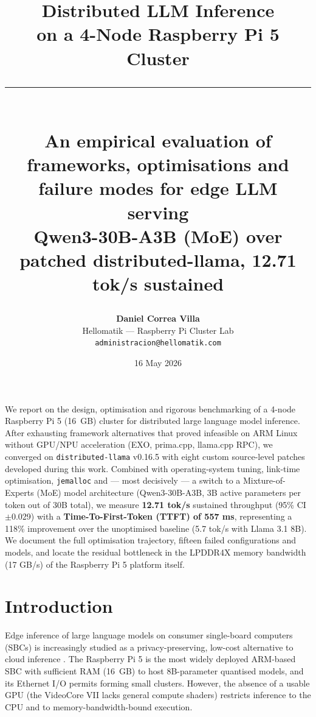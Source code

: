 \documentclass[11pt,a4paper]{article}
\title{
  \vspace{-1cm}
  {\Huge\bfseries\color{primary} Distributed LLM Inference}\\[0.3cm]
  {\Large on a 4-Node Raspberry Pi 5 Cluster}\\[0.4cm]
  \rule{\textwidth}{1.5pt}\\[0.3cm]
  {\large An empirical evaluation of frameworks, optimisations and \\ failure modes for edge LLM serving}\\[0.3cm]
  {\normalsize Qwen3-30B-A3B (MoE) over patched distributed-llama, 12.71 tok/s sustained}
}
\author{
  \textbf{Daniel Correa Villa}\\
  \small Hellomatik — Raspberry Pi Cluster Lab\\
  \small \texttt{administracion@hellomatik.com}
}
\date{16 May 2026}
\begin{document}
\maketitle
\thispagestyle{empty}

\begin{tcolorbox}[colback=primary!5,colframe=primary!50,title=\textbf{Abstract}]
We report on the design, optimisation and rigorous benchmarking of a 4-node Raspberry Pi 5 (16~GB) cluster for distributed large language model inference. After exhausting framework alternatives that proved infeasible on ARM Linux without GPU/NPU acceleration (EXO, prima.cpp, llama.cpp RPC), we converged on \texttt{distributed-llama} v0.16.5 with eight custom source-level patches developed during this work. Combined with operating-system tuning, link-time optimisation, \texttt{jemalloc} and --- most decisively --- a switch to a Mixture-of-Experts (MoE) model architecture (Qwen3-30B-A3B, 3B active parameters per token out of 30B total), we measure \textbf{12.71 tok/s} sustained throughput (95\% CI $\pm$0.029) with a \textbf{Time-To-First-Token (TTFT) of 557 ms}, representing a 118\% improvement over the unoptimised baseline (5.7 tok/s with Llama 3.1 8B). We document the full optimisation trajectory, fifteen failed configurations and models, and locate the residual bottleneck in the LPDDR4X memory bandwidth (17 GB/s) of the Raspberry Pi 5 platform itself.
\end{tcolorbox}

\section{Introduction}

Edge inference of large language models on consumer single-board computers (SBCs) is increasingly studied as a privacy-preserving, low-cost alternative to cloud inference \cite{geerling2025,stratosphere2025}. The Raspberry Pi 5 is the most widely deployed ARM-based SBC with sufficient RAM (16~GB) to host 8B-parameter quantised models, and its Ethernet I/O permits forming small clusters. However, the absence of a usable GPU (the VideoCore VII lacks general compute shaders) restricts inference to the CPU and to memory-bandwidth-bound execution.
\end{document}
